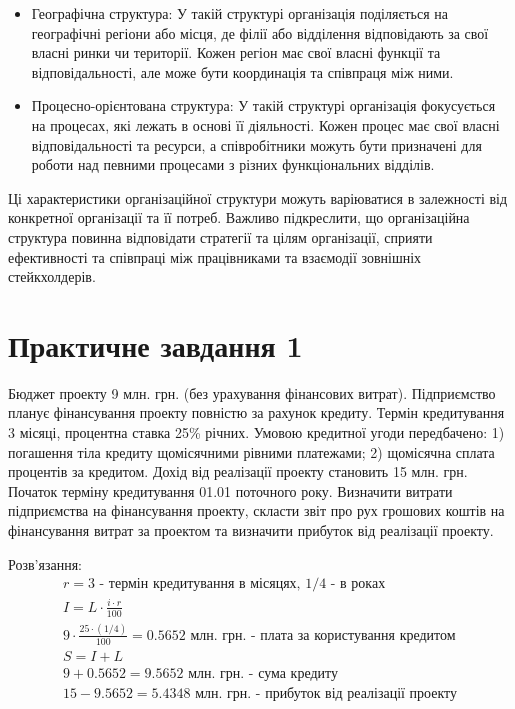 \documentclass[oneside,14pt]{extarticle}
\begin{document}
\begin{itemize}
	\item Географічна структура: У такій структурі організація поділяється на географічні регіони або місця, де філії або відділення відповідають за свої власні ринки чи території. Кожен регіон має свої власні функції та відповідальності, але може бути координація та співпраця між ними.
	\item Процесно-орієнтована структура: У такій структурі організація фокусується на процесах, які лежать в основі її діяльності. Кожен процес має свої власні відповідальності та ресурси, а співробітники можуть бути призначені для роботи над певними процесами з різних функціональних відділів.
\end{itemize}

Ці характеристики організаційної структури можуть варіюватися в залежності від конкретної організації та її потреб. Важливо підкреслити, що організаційна структура повинна відповідати стратегії та цілям організації, сприяти ефективності та співпраці між працівниками та взаємодії зовнішніх стейкхолдерів.

\newpage
\section*{Практичне завдання 1}

Бюджет проекту 9 млн. грн. (без урахування фінансових витрат). Підприємство планує фінансування проекту повністю за рахунок кредиту. Термін кредитування 3 місяці, процентна ставка 25\% річних. Умовою кредитної угоди передбачено: 1) погашення тіла кредиту щомісячними рівними платежами; 2) щомісячна сплата процентів за кредитом. Дохід від реалізації проекту становить 15 млн. грн. Початок терміну кредитування 01.01 поточного року. Визначити витрати підприємства на фінансування проекту, скласти звіт про рух грошових коштів на фінансування витрат за проектом та визначити прибуток від реалізації проекту.

Розв'язання:
\begin{gather}
	r=3\text{ - термін кредитування в місяцях, }1/4\text{ - в роках}\nonumber\\
	I=L\cdot\frac{i\cdot r}{100}\nonumber\\
	9\cdot\frac{25\cdot (1/4)}{100}=0.5652\text{ млн. грн. - плата за користування кредитом}\nonumber\\
	S=I+L\nonumber\\
	9+0.5652=9.5652\text{ млн. грн. - сума кредиту}\nonumber\\
	15-9.5652=5.4348\text{ млн. грн. - прибуток від реалізації проекту}\nonumber
\end{gather}
\end{document}
